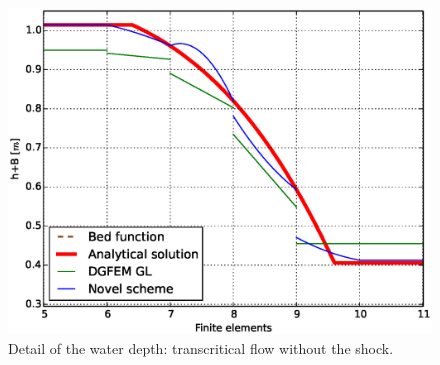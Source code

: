 \begin{figure}[!ht]
\begin{minipage}[t]{0.44\textwidth}
\begin{center}
								    \includegraphics[width=1.0\textwidth]{OBR/bump/transHdet.eps}
								    \caption{Detail of the water depth: transcritical flow without the shock.}
								    \label{transHdet}
								    \end{center}
								\end{minipage}
				\end{figure}
